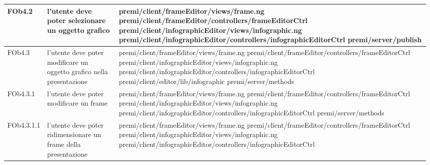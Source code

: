 \begin{longtable}{|l|p{5cm}|p{7cm}|}
FOb4.2 & l'utente deve poter selezionare un oggetto grafico & \hspace{0pt}premi/client/frameEditor/views/frame.ng \linebreak \linebreak premi/client/frameEditor/controllers/frameEditorCtrl \linebreak \linebreak premi/client/infographicEditor/views/infographic.ng \linebreak \linebreak premi/client/infographicEditor/controllers/infographicEditorCtrl \linebreak \linebreak premi/server/publish \\
\hline
FOb4.3 & l'utente deve poter modificare un oggetto grafico nella presentazione & \hspace{0pt}premi/client/frameEditor/views/frame.ng \linebreak \linebreak premi/client/frameEditor/controllers/frameEditorCtrl \linebreak \linebreak premi/client/infographicEditor/views/infographic.ng \linebreak \linebreak premi/client/infographicEditor/controllers/infographicEditorCtrl \linebreak \linebreak premi/client/editor/lib/infographic \linebreak \linebreak premi/server/methods \\
\hline
FOb4.3.1 & l'utente deve poter modificare un frame & \hspace{0pt}premi/client/frameEditor/views/frame.ng \linebreak \linebreak premi/client/frameEditor/controllers/frameEditorCtrl \linebreak \linebreak premi/client/infographicEditor/views/infographic.ng \linebreak \linebreak premi/client/infographicEditor/controllers/infographicEditorCtrl  \linebreak \linebreak premi/server/methods \\
\hline
FOb4.3.1.1 & l'utente deve poter ridimensionare un frame della presentazione & \hspace{0pt}premi/client/frameEditor/views/frame.ng \linebreak \linebreak premi/client/frameEditor/controllers/frameEditorCtrl \linebreak \linebreak premi/client/infographicEditor/views/infographic.ng \linebreak \linebreak premi/client/infographicEditor/controllers/infographicEditorCtrl \\

\end{longtable}
